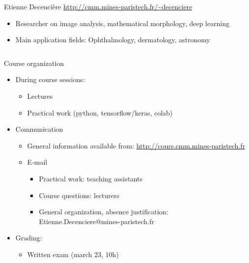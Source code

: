 \documentclass[xcolor=pdftex,dvipsnames,table,mathserif]{beamer}
\begin{document}
{\begin{columns}
\begin{column}{.8\textwidth}
    \begin{block}{Etienne Decencière \hfill \scriptsize{\url{http://cmm.mines-paristech.fr/\~decenciere}}}
      \scriptsize{
    \begin{itemize}
    \item Researcher on image analysis, mathematical morphology, deep learning
    \item Main application fields: Ophthalmology, dermatology, astronomy
    \end{itemize}
    }
  \end{block}

  \end{column}
\end{columns}

}

\begin{frame}{Course organization}

  \begin{itemize}
  \item During course sessions:
    \begin{itemize}
    \item Lectures
    \item Practical work (python, tensorflow/keras, colab)
    \end{itemize}
  \item Communication
  \begin{itemize}
  \item General information available from: \url{http://cours.cmm.mines-paristech.fr}
  \item E-mail
    \begin{itemize}
    \item Practical work: teaching assistants
    \item Course questions: lecturers
    \item General organization, absence justification: Etienne.Decenciere@mines-paristech.fr
    \end{itemize}
  \end{itemize}
\item Grading:
\begin{itemize}
\item Written exam (march 23, 10h)
\end{itemize}

   \end{itemize}
\end{frame}
\end{document}
